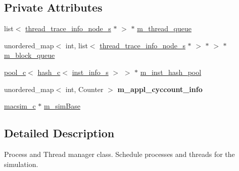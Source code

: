 \subsection*{Private Attributes}
\begin{DoxyCompactItemize}
\item 
list$<$ \hyperlink{structthread__trace__info__node__s}{thread\_\-trace\_\-info\_\-node\_\-s} $\ast$ $>$ $\ast$ \hyperlink{classprocess__manager__c_a0fa9dc97ed1a88aadc63b0a82ef24896}{m\_\-thread\_\-queue}
\item 
unordered\_\-map$<$ int, list$<$ \hyperlink{structthread__trace__info__node__s}{thread\_\-trace\_\-info\_\-node\_\-s} $\ast$ $>$ $\ast$ $>$ $\ast$ \hyperlink{classprocess__manager__c_a07f5bef183ba3a7f15ed362c562c1137}{m\_\-block\_\-queue}
\item 
\hyperlink{classpool__c}{pool\_\-c}$<$ \hyperlink{classhash__c}{hash\_\-c}$<$ \hyperlink{classinst__info__s}{inst\_\-info\_\-s} $>$ $>$ $\ast$ \hyperlink{classprocess__manager__c_ae5ef36e1434826d79d370c9afcb174bc}{m\_\-inst\_\-hash\_\-pool}
\item 
\hypertarget{classprocess__manager__c_a556db8ba188f7831fdae0c7b608cf731}{
unordered\_\-map$<$ int, Counter $>$ {\bfseries m\_\-appl\_\-cyccount\_\-info}}
\label{classprocess__manager__c_a556db8ba188f7831fdae0c7b608cf731}

\item 
\hyperlink{classmacsim__c}{macsim\_\-c} $\ast$ \hyperlink{classprocess__manager__c_a6cca65c36ed2b7747dd13857fcce6ee9}{m\_\-simBase}
\end{DoxyCompactItemize}


\subsection{Detailed Description}
Process and Thread manager class. Schedule processes and threads for the simulation. 

